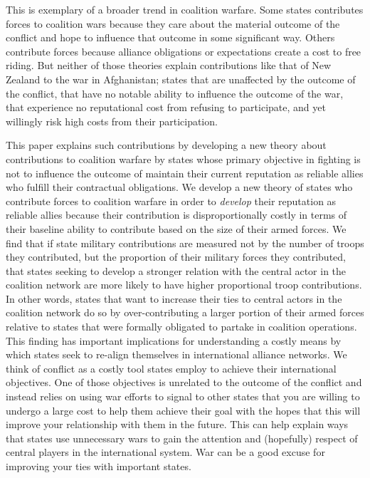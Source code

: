 \documentclass[12pt,letterpaper]{article}
\begin{document}
	This is exemplary of a broader trend in coalition warfare. Some states contributes forces to coalition wars because they care about the material outcome of the conflict and hope to influence that outcome in some significant way. Others contribute forces because alliance obligations or expectations create a cost to free riding. But neither of those theories explain contributions like that of New Zealand to the war in Afghanistan; states that are unaffected by the outcome of the conflict, that have no notable ability to influence the outcome of the war, that experience no reputational cost from refusing to participate, and yet willingly risk high costs from their participation.
	
	This paper explains such contributions by developing a new theory about contributions to coalition warfare by states whose primary objective in fighting is not to influence the outcome of maintain their current reputation as reliable allies who fulfill their contractual obligations. We develop a new theory of states who contribute forces to coalition warfare in order to \textit{develop} their reputation as reliable allies because their contribution is disproportionally costly in terms of their baseline ability to contribute based on the size of their armed forces. We find that if state military contributions are measured not by the number of troops they contributed, but the proportion of their military forces they contributed, that states seeking to develop a stronger relation with the central actor in the coalition network are more likely to have higher proportional troop contributions. In other words, states that want to increase their ties to central actors in the coalition network do so by over-contributing a larger portion of their armed forces relative to states that were formally obligated to partake in coalition operations. This finding has important implications for understanding a costly means by which states seek to re-align themselves in international alliance networks. We think of conflict as a costly tool states employ to achieve their international objectives. One of those objectives is unrelated to the outcome of the conflict and instead relies on using war efforts to signal to other states that you are willing to undergo a large cost to help them achieve their goal with the hopes that this will improve your relationship with them in the future. This can help explain ways that states use unnecessary wars to gain the attention and (hopefully) respect of central players in the international system. War can be a good excuse for improving your ties with important states.
	
\end{document}
